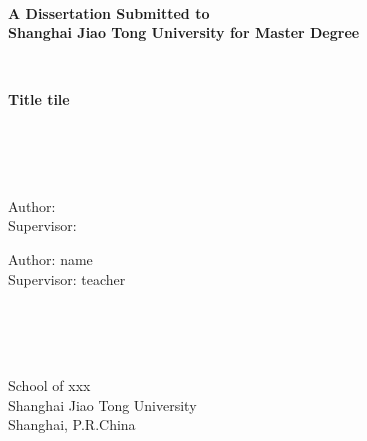 \newpage
\thispagestyle{empty}
~\\
\begin{center}
\textbf{
A Dissertation Submitted to \\
Shanghai Jiao Tong University for Master Degree}
\end{center}
~\\
\begin{center}
\textbf{Title tile
}
\end{center}
~\\
~\\
~\\
\ifx\isblindreview\istrue
\begin{center}
    Author:  \\ %
    Supervisor:  
\end{center}
\else
\begin{center}
    Author: name\\
    Supervisor:  teacher
    \end{center}
\fi
~\\
~\\
~\\
\begin{center}
    School of xxx\\
    Shanghai Jiao Tong University \\
    Shanghai, P.R.China \\ 
\end{center}
